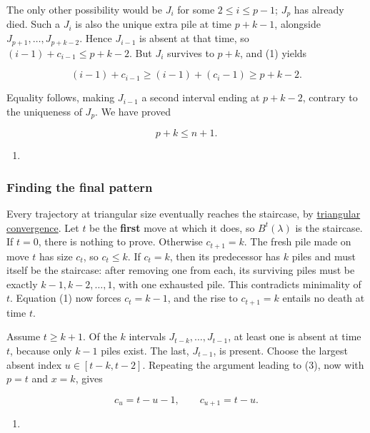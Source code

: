 \documentclass[11pt,a4paper]{article}
\providecommand{\tightlist}{\setlength{\itemsep}{0pt}\setlength{\parskip}{0pt}}
\begin{document}
The only other possibility would be \(J_i\) for some \(2\le i\le p-1\); \(J_p\) has already died. Such a \(J_i\) is also the unique extra pile at time \(p+k-1\), alongside \(J_{p+1},\ldots,J_{p+k-2}\). Hence \(J_{i-1}\) is absent at that time, so \((i-1)+c_{i-1}\le p+k-2\). But \(J_i\) survives to \(p+k\), and (1) yields

\[
(i-1)+c_{i-1}\ge(i-1)+(c_i-1)\ge p+k-2.
\]

Equality follows, making \(J_{i-1}\) a second interval ending at \(p+k-2\), contrary to the uniqueness of \(J_p\). We have proved

\[
\boxed{p+k\le n+1}.
\]

\begin{enumerate}
\def\labelenumi{(\arabic{enumi})}
\setcounter{enumi}{7}
\tightlist
\item
\end{enumerate}

\subsubsection{Finding the final pattern}\label{finding-the-final-pattern}

Every trajectory at triangular size eventually reaches the staircase, by \href{https://github.com/mpelteshki/climbing-to-the-frontier/blob/212bba53b1818c08c40b8c4b48f636651eaf6410/cagent/p3/lean/ProofPursuit/P3/TriangularGeneral.lean}{triangular convergence}. Let \(t\) be the \textbf{first} move at which it does, so \(B^t(\lambda)\) is the staircase. If \(t=0\), there is nothing to prove. Otherwise \(c_{t+1}=k\). The fresh pile made on move \(t\) has size \(c_t\), so \(c_t\le k\). If \(c_t=k\), then its predecessor has \(k\) piles and must itself be the staircase: after removing one from each, its surviving piles must be exactly \(k-1,k-2,\ldots,1\), with one exhausted pile. This contradicts minimality of \(t\). Equation (1) now forces \(c_t=k-1\), and the rise to \(c_{t+1}=k\) entails no death at time \(t\).

Assume \(t\ge k+1\). Of the \(k\) intervals \(J_{t-k},\ldots,J_{t-1}\), at least one is absent at time \(t\), because only \(k-1\) piles exist. The last, \(J_{t-1}\), is present. Choose the largest absent index \(u\in[t-k,t-2]\). Repeating the argument leading to (3), now with \(p=t\) and \(x=k\), gives

\[
c_u=t-u-1,\qquad c_{u+1}=t-u.
\]

\begin{enumerate}
\def\labelenumi{(\arabic{enumi})}
\setcounter{enumi}{8}
\tightlist
\item
\end{enumerate}
\end{document}
